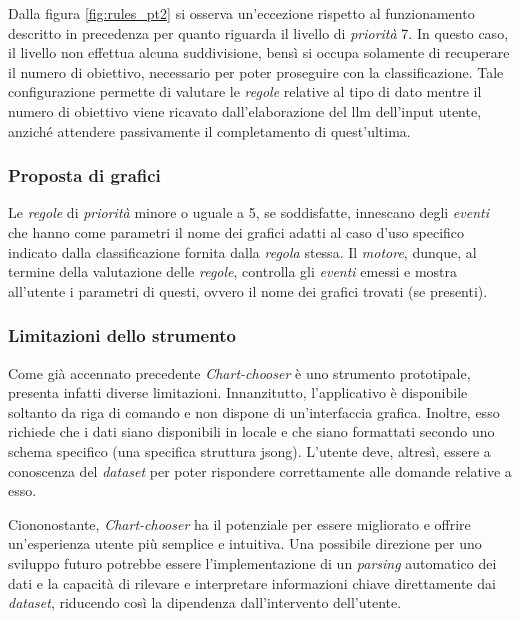 Dalla figura \ref{fig:rules_pt2} si osserva un'eccezione rispetto al funzionamento descritto in precedenza per quanto riguarda il livello di \emph{priorità} 7. In questo caso, il livello non effettua alcuna suddivisione, 
bensì si occupa solamente di recuperare il numero di obiettivo, necessario per poter proseguire con la classificazione. Tale configurazione permette di valutare le \emph{regole} relative al tipo di dato mentre  
il numero di obiettivo viene ricavato dall'elaborazione del \gls{llm} dell'input utente, anziché attendere passivamente il completamento di quest'ultima.


\subsubsection{Proposta di grafici}
Le \emph{regole} di \emph{priorità} minore o uguale a 5, se soddisfatte, innescano degli \emph{eventi} che hanno come parametri il nome dei grafici adatti al caso d'uso specifico indicato dalla classificazione fornita dalla \emph{regola} stessa. 
Il \emph{motore}, dunque, al termine della valutazione delle \emph {regole}, controlla gli \emph{eventi} emessi e mostra all'utente i parametri di questi, ovvero il nome dei grafici trovati (se presenti).



\subsubsection{Limitazioni dello strumento}
Come già accennato precedente \emph{Chart-chooser} è uno strumento prototipale, presenta infatti diverse limitazioni.
Innanzitutto, l'applicativo è disponibile soltanto da riga di comando e non dispone di un'interfaccia grafica.
Inoltre, esso richiede che i dati siano disponibili in locale e che siano formattati secondo uno schema specifico
(una specifica struttura \gls{jsong}). 
L'utente deve, altresì, essere a conoscenza del \emph{dataset} per poter rispondere correttamente alle domande relative a esso.

Ciononostante, \emph{Chart-chooser} ha il potenziale per essere migliorato e offrire un'esperienza utente più semplice e intuitiva. 
Una possibile direzione per uno sviluppo futuro potrebbe essere l'implementazione di un \emph{parsing} automatico dei dati e la capacità di 
rilevare e interpretare informazioni chiave direttamente dai \emph{dataset}, riducendo così la dipendenza dall'intervento dell'utente. 